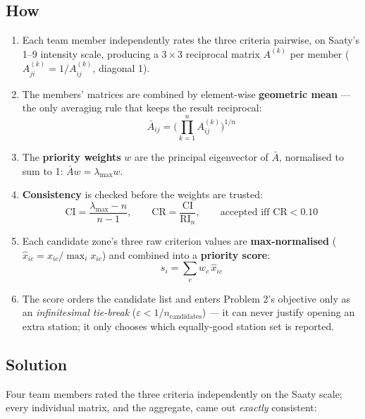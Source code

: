 \documentclass[11pt]{article}
\begin{document}
\subsection*{How}
\begin{enumerate}
  \item Each team member independently rates the three criteria pairwise, on
    Saaty's 1--9 intensity scale, producing a $3\times3$ reciprocal matrix
    $A^{(k)}$ per member ($A^{(k)}_{ji} = 1/A^{(k)}_{ij}$, diagonal 1).
  \item The members' matrices are combined by element-wise \textbf{geometric
    mean} --- the only averaging rule that keeps the result reciprocal:
    \[
      \bar A_{ij} = \Big(\textstyle\prod_{k=1}^{n} A^{(k)}_{ij}\Big)^{1/n}
    \]
  \item The \textbf{priority weights} $w$ are the principal eigenvector of
    $\bar A$, normalised to sum to 1: $\bar A w = \lambda_{\max} w$.
  \item \textbf{Consistency} is checked before the weights are trusted:
    \[
      \mathrm{CI} = \frac{\lambda_{\max}-n}{n-1}, \qquad
      \mathrm{CR} = \frac{\mathrm{CI}}{\mathrm{RI}_n}, \qquad
      \text{accepted iff } \mathrm{CR} < 0.10
    \]
  \item Each candidate zone's three raw criterion values are
    \textbf{max-normalised} ($\hat x_{ic} = x_{ic}/\max_i x_{ic}$) and combined
    into a \textbf{priority score}:
    \[
      s_i = \sum_{c} w_c\, \hat x_{ic}
    \]
  \item The score orders the candidate list and enters Problem 2's objective
    only as an \emph{infinitesimal tie-break} ($\varepsilon < 1/n_{\text{candidates}}$)
    --- it can never justify opening an extra station; it only chooses which
    equally-good station set is reported.
\end{enumerate}

\subsection*{Solution}
Four team members rated the three criteria independently on the Saaty scale;
every individual matrix, and the aggregate, came out \emph{exactly}
consistent:
\end{document}
